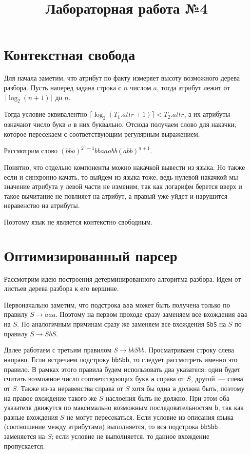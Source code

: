 \documentclass{article}
\title{Лабораторная работа №4}
\author{}
\date{}
\begin{document}
\maketitle

\section{Контекстная свобода}

Для начала заметим, что атрибут по факту измеряет высоту возможного дерева разбора.
Пусть наперед задана строка с $n$ числом $a$, тогда атрибут лежит от $\lceil \log_2(n+1) \rceil$ до $n$.

Тогда условие эквивалентно $\lceil \log_2(T_1.attr+1) \rceil < T_2.attr$, а их атрибуты означают число букв $a$ в них буквально.
Отсюда получаем слово для накачки, которое пересекаем с соответствующим регулярным выражением.

Рассмотрим слово $(bba)^{2^n-1} bbaaabb (abb)^{n+1}$.

Понятно, что отдельно компоненты можно накачкой вывести из языка. Но также если и синхронно качать, то выйдем из языка тоже, ведь нулевой накачкой мы значение атрибута у левой части не изменим, так как логарифм берется вверх и такое вычитание не повлияет на атрибут, а правый уже уйдет и нарушится неравенство на атрибуты.

Поэтому язык не является контекстно свободным.


\section{Оптимизированный парсер}

Рассмотрим идею построения детерминированного алгоритма разбора.
Идем от листьев дерева разбора к его вершине.

Первоначально заметим, что подстрока \texttt{aaa} может быть получена только по правилу $S \rightarrow aaa$.
Поэтому на первом проходе сразу заменяем все вхождения \texttt{aaa} на $S$.
По аналогичным причинам сразу же заменяем все вхождения \texttt{SbS} на $S$ по правилу $S \rightarrow SbS$.

Далее работаем с третьим правилом $S \rightarrow bbSbb$.
Просматриваем строку слева направо.
Если встречаем подстроку \texttt{bbSbb}, то следует рассмотреть именно это правило.
В рамках этого правила будем использовать два указателя:
один будет считать возможное число соответствующих букв \texttt{a} справа от $S$,
другой~--- слева от $S$. Также из-за неравенства справа от $S$ хотя бы одна \texttt{a} должна быть, поэтому на правое вхождение такого же $S$ наслоения быть не должно.
При этом оба указателя движутся по максимально возможным последовательностям \texttt{b},
так как разные вхождения $S$ не могут пересекаться.
Если условие из описания языка (соотношение между атрибутами) выполняется,
то вся подстрока \texttt{bbSbb} заменяется на $S$;
если условие не выполняется, то данное вхождение пропускается.
\end{document}
